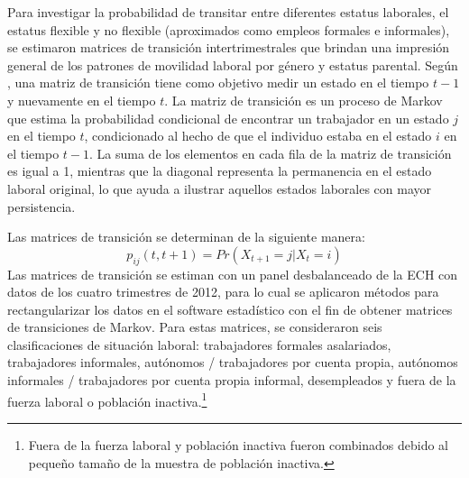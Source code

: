 Para investigar la probabilidad de transitar entre diferentes estatus laborales, el estatus flexible y no flexible (aproximados como empleos formales e informales), se estimaron matrices de transición intertrimestrales que brindan una impresión general de los patrones de movilidad laboral por género y estatus parental. Según \citet{Nichols2014}, una matriz de transición tiene como objetivo medir un estado en el tiempo $t-1$ y nuevamente en el tiempo $t$. La matriz de transición es un proceso de Markov que estima la probabilidad condicional de encontrar un trabajador en un estado $j$ en el tiempo $t$, condicionado al hecho de que el individuo estaba en el estado $i$ en el tiempo $t-1$. La suma de los elementos en cada fila de la matriz de transición es igual a 1, mientras que la diagonal representa la permanencia en el estado laboral original, lo que ayuda a ilustrar aquellos estados laborales con mayor persistencia.

Las matrices de transición se determinan de la siguiente manera:
%
\begin{equation}
    p_{ij}(t, t + 1) = Pr(X_{t + 1} = j | X_{t} = i)   
\end{equation}
%
Las matrices de transición se estiman con un panel desbalanceado de la ECH con datos de los cuatro trimestres de 2012, para lo cual se aplicaron métodos para rectangularizar los datos en el software estadístico con el fin de obtener matrices de transiciones de Markov. Para estas matrices, se consideraron seis clasificaciones de situación laboral: trabajadores formales asalariados, trabajadores informales, autónomos / trabajadores por cuenta propia, autónomos informales / trabajadores por cuenta propia informal, desempleados y fuera de la fuerza laboral o población inactiva.\footnote{Fuera de la fuerza laboral y población inactiva fueron combinados debido al pequeño tamaño de la muestra de población inactiva.}